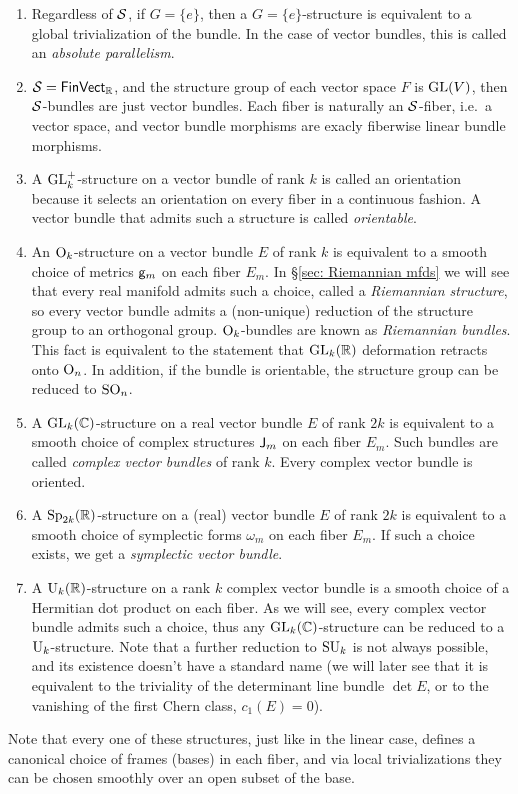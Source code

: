 \begin{example}
    \begin{enumerate}
        \item Regardless of $\mathcal{S}$, if $G=\{e\}$, then a $G=\{e\}$-structure is equivalent to a global trivialization of the bundle. In the case of vector bundles, this is called an \emph{absolute parallelism}.
        \item $\mathcal{S}=\mathsf{FinVect}_{\mathbb{R}}$, and the structure group of each vector space $F$ is $\operatorname{GL}(V)$, then $\mathcal{S}$-bundles are just vector bundles. Each fiber is naturally an $\mathcal{S}$-fiber, i.e.\ a vector space, and vector bundle morphisms are exacly fiberwise linear bundle morphisms.
        \item A $\operatorname{GL}_k^+$-structure on a vector bundle of rank $k$ is called an orientation because it selects an orientation on every fiber in a continuous fashion. A vector bundle that admits such a structure is called \emph{orientable}.
        \item An $\operatorname{O}_k$-structure on a vector bundle $E$ of rank $k$ is equivalent to a smooth choice of metrics $\mathsf{g}_m$ on each fiber $E_m$. In \S\ref{sec: Riemannian mfds} we will see that every real manifold admits such a choice, called a \emph{Riemannian structure}, so every vector bundle admits a (non-unique) reduction of the structure group to an orthogonal group. $\operatorname{O}_k$-bundles are known as \emph{Riemannian bundles}. This fact is equivalent to the statement that $\operatorname{GL}_k(\mathbb{R})$ deformation retracts onto $\operatorname{O}_n$. In addition, if the bundle is orientable, the structure group can be reduced to $\operatorname{SO}_n$.
        \item A $\operatorname{GL}_k(\mathbb{C})$-structure on a real vector bundle $E$ of rank $2k$ is equivalent to a smooth choice of complex structures $\mathsf{J}_m$ on each fiber $E_m$. Such bundles are called \emph{complex vector bundles} of rank $k$. Every complex vector bundle is oriented.
        \item A $\operatorname{Sp}_{2k}(\mathbb{R})$-structure on a (real) vector bundle $E$ of rank $2k$ is equivalent to a smooth choice of symplectic forms $\omega_m$ on each fiber $E_m$. If such a choice exists, we get a \emph{symplectic vector bundle}.
        \item A $\operatorname{U}_k(\mathbb{R})$-structure on a rank $k$ complex vector bundle is a smooth choice of a Hermitian dot product on each fiber. As we will see, every complex vector bundle admits such a choice, thus any $\operatorname{GL}_k(\mathbb{C})$-structure can be reduced to a $\operatorname{U}_k$-structure. Note that a further reduction to $\operatorname{SU}_k$ is not always possible, and its existence doesn't have a standard name (we will later see that it is equivalent to the triviality of the determinant line bundle $\det E$, or to the vanishing of the first Chern class, $c_1(E)=0$).
    \end{enumerate}
    Note that every one of these structures, just like in the linear case, defines a canonical choice of frames (bases) in each fiber, and via local trivializations they can be chosen smoothly over an open subset of the base. 
\end{example}

